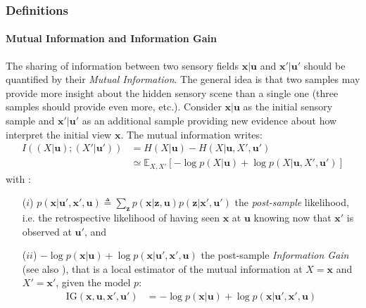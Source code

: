 \documentclass[12pt,twoside,openright]{article}
\begin{document}

\subsubsection{Definitions}

\paragraph{Mutual Information and Information Gain}
The sharing of information between two sensory fields $\boldsymbol{x}|\boldsymbol{u}$ and $\boldsymbol{x}'|\boldsymbol{u}'$  should be quantified by their \emph{Mutual Information}. The general idea is that two samples may provide more insight about the hidden sensory scene than a single one (three samples should provide even more, etc.). 
{\color{Purple} Consider $\boldsymbol{x}|\boldsymbol{u}$ as the initial sensory sample and $\boldsymbol{x}'|\boldsymbol{u}'$ as an additional sample providing new evidence about how interpret the initial view $\boldsymbol{x}$}.
The mutual information writes:
\begin{align}
	I((X| \boldsymbol{u}); (X'| \boldsymbol{u}')) &= H(X| \boldsymbol{u}) - H(X| \boldsymbol{u}, X', \boldsymbol{u}')\label{eq:mutual-info}\\
	&\simeq \mathbb{E}_{X,X'} \left[-\log p(X| \boldsymbol{u}) + \log p(X| \boldsymbol{u}, X', \boldsymbol{u}')\right] 
\end{align}
with :
\begin{itemize}
	\item[($i$)] $ p(\boldsymbol{x}| \boldsymbol{u}', \boldsymbol{x}', \boldsymbol{u}) \triangleq \sum_{\boldsymbol{z}} p(\boldsymbol{x}|\boldsymbol{z}, \boldsymbol{u}) p(\boldsymbol{z}|\boldsymbol{x}', \boldsymbol{u}')$ 
	the \emph{post-sample} likelihood, i.e. the retrospective likelihood of having seen $\boldsymbol{x}$ at $\boldsymbol{u}$ knowing now that $\boldsymbol{x}'$ is observed at $\boldsymbol{u}'$, and
	\item[($ii$)] 
	$-\log p(\boldsymbol{x}| \boldsymbol{u}) + \log p(\boldsymbol{x}| \boldsymbol{u}', \boldsymbol{x}', \boldsymbol{u})$ the post-sample
	\emph{Information Gain} (see also \citet{tishby2011information}), that is a local estimator of the mutual information at $X = \boldsymbol{x}$ and $X' = \boldsymbol{x}'$, {\color{Purple} given the model $p$}:
	\begin{align}
		\text{IG}(\boldsymbol{x},\boldsymbol{u}, \boldsymbol{x}', \boldsymbol{u}') 
		&= -\log p(\boldsymbol{x}| \boldsymbol{u}) + \log p(\boldsymbol{x}| \boldsymbol{u}', \boldsymbol{x}', \boldsymbol{u}) \label{eq:info-gain}
	\end{align}
\end{itemize}
\end{document}
